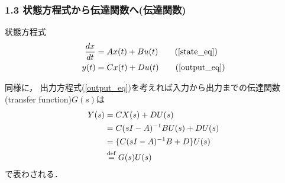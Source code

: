 \begin{frame}[t]
\frametitle{1.3 状態方程式から伝達関数へ(伝達関数)}
状態方程式
\begin{align}
   \frac{dx}{dt} &= A x(t) + B u(t) \tag{\ref{state_eq}} \\
 y(t) &= C x(t) + D u(t) \tag{\ref{output_eq}}
\end{align}

同様に，
出力方程式(\ref{output_eq})を考えれば入力から出力までの伝達関数(transfer function)$G(s)$は
\begin{align}
 Y(s) &= C X(s) + D U(s) \nonumber \\
      &= C (s I - A)^{-1} B U(s) + D U(s) \nonumber \\
      &= \{ C ( s I - A )^{-1} B + D \} U(s) \\
      &\stackrel{\rm def}{=} G(s) U(s)
\end{align}
で表わされる．
\end{frame}

